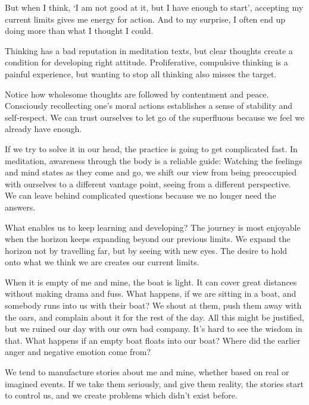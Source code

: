 
But when I think, `I am not good at it, but I have enough to start',
accepting my current limits gives me energy for action. And to my
surprise, I often end up doing more than what I thought I could.

Thinking has a bad reputation in meditation texts, but clear thoughts
create a condition for developing right attitude. Proliferative,
compulsive thinking is a painful experience, but wanting to stop all
thinking also misses the target.

Notice how wholesome thoughts are followed by contentment and peace.
Consciously recollecting one's moral actions establishes a sense of
stability and self-respect. We can trust ourselves to let go of the
superfluous because we feel we already have enough.

If we try to solve it in our head, the practice is going to get
complicated fast. In meditation, awareness through the body is a
reliable guide: Watching the feelings and mind states as they come and
go, we shift our view from being preoccupied with ourselves to a
different vantage point, seeing from a different perspective. We can
leave behind complicated questions because we no longer need the
answers.


What enables us to keep learning and developing? The journey is most
enjoyable when the horizon keeps expanding beyond our previous limits.
We expand the horizon not by travelling far, but by seeing with new
eyes. The desire to hold onto what we think we are creates our current
limits.

When it is empty of me and mine, the boat is light. It can cover great
distances without making drama and fuss. What happens, if we are sitting
in a boat, and somebody runs into us with their boat? We shout at them,
push them away with the oars, and complain about it for the rest of the
day. All this might be justified, but we ruined our day with our own bad
company. It's hard to see the wisdom in that. What happens if an empty
boat floats into our boat? Where did the earlier anger and negative
emotion come from?

We tend to manufacture stories about me and mine, whether based on real
or imagined events. If we take them seriously, and give them reality,
the stories start to control us, and we create problems which didn't
exist before.

\enlargethispage*{\baselineskip}

